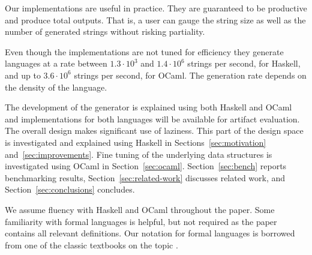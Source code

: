 Our implementations are useful in practice. They are guaranteed to be
productive and produce total outputs. That is, a user can gauge the
string size as well as the number of generated strings without risking
partiality.

Even though the implementations
are not tuned for efficiency they generate
languages at a rate between $1.3\cdot10^3$ and $1.4\cdot10^6$ strings per
second, for Haskell, and up to $3.6\cdot10^6$ strings per second, for
OCaml. The generation rate depends on the density of the language.


The development of the generator is explained using both Haskell and
OCaml and implementations for both languages will be available for
artifact evaluation. The overall design makes significant use of
laziness. This part of the design space is investigated and explained
using Haskell in Sections~\ref{sec:motivation}
and~\ref{sec:improvements}. Fine tuning of the underlying data
structures is investigated using OCaml in Section~\ref{sec:ocaml}.
Section~\ref{sec:bench} reports benchmarking results,
Section~\ref{sec:related-work} discusses related work, and
Section~\ref{sec:conclusions} concludes. 

We assume fluency with Haskell and OCaml throughout the paper.  Some
familiarity with formal languages is helpful, but not required as the
paper contains all relevant definitions. Our notation for formal
languages is borrowed from one of the classic textbooks on the topic
\cite{DBLP:books/daglib/0011126}.

